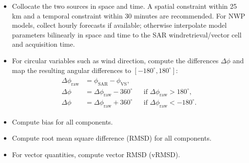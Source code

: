 \documentclass[a4paper,10pt,english]{sphinxmanual}
\begin{document}
\sphinxAtStartPar
{}
\begin{itemize}
\item {} 
\sphinxAtStartPar
Collocate the two sources in space and time. A spatial constraint within
25 km and a temporal constraint within 30 minutes are recommended. For NWP
models, collect hourly forecasts if available; otherwise interpolate model
parameters bilinearly in space and time to the SAR wind\sphinxhyphen{}retrieval/vector cell
and acquisition time.

\item {} 
\sphinxAtStartPar
For circular variables such as wind direction, compute the differences
\(\Delta\phi\) and map the resulting angular differences to
\([-180^\circ,180^\circ]\):
\begin{equation}\label{equation:alg-02-validation:eq-cvtdd-direction-difference}
\begin{split}\begin{aligned}
\Delta\phi_{\mathrm{raw}} &= \phi_{\mathrm{SAR}}-\phi_{\mathrm{VS}}, \\
\Delta\phi
  &= \Delta\phi_{\mathrm{raw}}-360^\circ
  &&\text{if }\Delta\phi_{\mathrm{raw}}>180^\circ, \\
\Delta\phi
  &= \Delta\phi_{\mathrm{raw}}+360^\circ
  &&\text{if }\Delta\phi_{\mathrm{raw}}<-180^\circ .
\end{aligned}\end{split}
\end{equation}
\item {} 
\sphinxAtStartPar
Compute bias for all components.

\item {} 
\sphinxAtStartPar
Compute root mean square difference (RMSD) for all components.

\item {} 
\sphinxAtStartPar
For vector quantities, compute vector RMSD (vRMSD).

\end{itemize}
\end{document}
